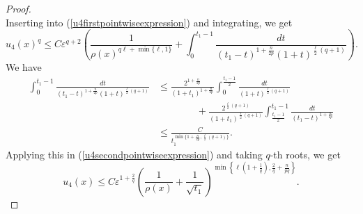 \documentclass[12pt]{amsart}
\renewcommand{\1}{{\mathbf 1}}
\newcommand{\eps}{{\varepsilon}}
\theoremstyle{others}
\numberwithin{equation}{section}
\begin{document}
\begin{proof}
\begin{equation*}
           \end{equation*}
Inserting into (\ref{u4firstpointwiseexpression}) and integrating, we get
    \begin{equation}\label{u4secondpointwiseexpression}
        u_4(x)^q \leq C \eps^{q + 2}  \left( \frac{1}{\rho(x)^{q\ell + \min \{ \ell, 1 \} } } + \int_0^{t_1 - 1}\frac{dt}{(t_1 - t)^{1 + \frac{n}{2p} }(1 + t)^{\frac{\ell}{2} \left( q + 1 \right)}}  \right).
    \end{equation}
    We have
    \begin{equation}\label{u4integraldumbcalc}
    \begin{split}
    \int_0^{t_1 - 1}\frac{dt}{(t_1 - t)^{1 + \frac{n}{2p} }(1 + t)^{\frac{\ell}{2} \left( q + 1 \right)}} & \leq \frac{2^{1 + \frac{n}{2p} }}{(1 + t_1)^{1 + \frac{n}{2p} }}\int_0^{\frac{t_1-1}{2}}\frac{dt}{(1 + t)^{\frac{\ell}{2} \left( q + 1 \right)}} \\
    & \qquad \qquad + \frac{2^{\frac{\ell}{2} \left( q + 1 \right)} }{(1 + t_1)^{\frac{\ell}{2} \left( q + 1 \right)}} \int_{\frac{t_1 - 1}{2}}^{t_1 - 1}\frac{dt}{(t_1 - t)^{1 + \frac{n}{2p} }} \\
    & \leq \frac{C}{t_1^{\min\{1 + \frac{n}{2p} ,\frac{\ell}{2} \left( q + 1 \right)\}} }.
    \end{split}
    \end{equation}
    Applying this in (\ref{u4secondpointwiseexpression}) and taking $q$-th roots, we get
        \begin{equation}\label{u4xest}
        u_4(x) \leq C \eps^{1 + \frac{2}{q} } \left( \frac{1}{\rho(x)} + \frac{1}{\sqrt{t_1}} \right)^{\min\left\{ \ell \left( 1 + \frac{1}{q} \right), \frac{2}{q} + \frac{n}{pq} \right\} }.
    \end{equation}
    

\end{proof}
\end{document}
